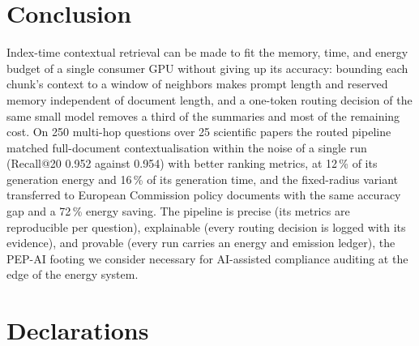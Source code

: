 \documentclass[pdflatex,sn-mathphys-num]{sn-jnl}
\makeatletter
\newcommand{\Rec}[1]{Recall@#1}
\theoremstyle{thmstyleone}%
\theoremstyle{thmstylethree}%
\makeatother
\begin{document}
\section{Conclusion}\label{sec:conclusion}

Index-time contextual retrieval can be made to fit the memory, time, and energy budget of a single consumer GPU without giving up its accuracy: bounding each chunk's context to a window of neighbors makes prompt length and reserved memory independent of document length, and a one-token routing decision of the same small model removes a third of the summaries and most of the remaining cost. On 250 multi-hop questions over 25 scientific papers the routed pipeline matched full-document contextualisation within the noise of a single run (\Rec{20} 0.952 against 0.954) with better ranking metrics, at 12\,\% of its generation energy and 16\,\% of its generation time, and the fixed-radius variant transferred to European Commission policy documents with the same accuracy gap and a 72\,\% energy saving. The pipeline is precise (its metrics are reproducible per question), explainable (every routing decision is logged with its evidence), and provable (every run carries an energy and emission ledger), the PEP-AI footing we consider necessary for AI-assisted compliance auditing at the edge of the energy system.

\backmatter

\section*{Declarations}
\end{document}
